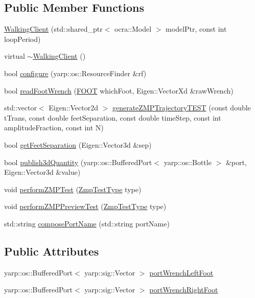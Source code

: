 \subsection*{Public Member Functions}
\begin{DoxyCompactItemize}
\item 
\hyperlink{classWalkingClient_a6c9002a44a54814c4b482739824e39aa}{Walking\+Client} (std\+::shared\+\_\+ptr$<$ ocra\+::\+Model $>$ model\+Ptr, const int loop\+Period)
\item 
virtual \hyperlink{classWalkingClient_a1dbc0308f844aea6542750104fddf8e2}{$\sim$\+Walking\+Client} ()
\item 
bool \hyperlink{classWalkingClient_adb8f972f34cb39c69c02a7c3cb493b81}{configure} (yarp\+::os\+::\+Resource\+Finder \&rf)
\item 
bool \hyperlink{classWalkingClient_a03ea2313c954a97aeb4d5b614f3e6caa}{read\+Foot\+Wrench} (\hyperlink{ZmpController_8h_a4b6a8e135f90bd56e5a57a60efb42529}{F\+O\+OT} which\+Foot, Eigen\+::\+Vector\+Xd \&raw\+Wrench)
\item 
std\+::vector$<$ Eigen\+::\+Vector2d $>$ \hyperlink{classWalkingClient_a3185a8ede8bf8b1227f7dd540ba87e3c}{generate\+Z\+M\+P\+Trajectory\+T\+E\+ST} (const double t\+Trans, const double feet\+Separation, const double time\+Step, const int amplitude\+Fraction, const int N)
\item 
bool \hyperlink{classWalkingClient_a87e70046251149b4b7aff1dc57b3dcc4}{get\+Feet\+Separation} (Eigen\+::\+Vector3d \&sep)
\item 
bool \hyperlink{classWalkingClient_ae6d6c046a9a3e51771afe8b4c105b412}{publish3d\+Quantity} (yarp\+::os\+::\+Buffered\+Port$<$ yarp\+::os\+::\+Bottle $>$ \&port, Eigen\+::\+Vector3d \&value)
\item 
void \hyperlink{classWalkingClient_ae3c259f7615c85ce53a413f6e7ab4b76}{perform\+Z\+M\+P\+Test} (\hyperlink{WalkingClient_8h_afc01479a47f5a87462a54b6a9e11fffa}{Zmp\+Test\+Type} type)
\item 
void \hyperlink{classWalkingClient_a3b1217b7fa17f76f162be0e12e419d96}{perform\+Z\+M\+P\+Preview\+Test} (\hyperlink{WalkingClient_8h_afc01479a47f5a87462a54b6a9e11fffa}{Zmp\+Test\+Type} type)
\item 
std\+::string \hyperlink{classWalkingClient_ae8f7dc629313df7d362e3edd6f45ae10}{compose\+Port\+Name} (std\+::string port\+Name)
\end{DoxyCompactItemize}
\subsection*{Public Attributes}
\begin{DoxyCompactItemize}
\item 
yarp\+::os\+::\+Buffered\+Port$<$ yarp\+::sig\+::\+Vector $>$ \hyperlink{classWalkingClient_a88ee63ff6a341eccd458d24700383457}{port\+Wrench\+Left\+Foot}
\item 
yarp\+::os\+::\+Buffered\+Port$<$ yarp\+::sig\+::\+Vector $>$ \hyperlink{classWalkingClient_a96321dc60e84c193f2dea6e85983ca67}{port\+Wrench\+Right\+Foot}
\end{DoxyCompactItemize}

